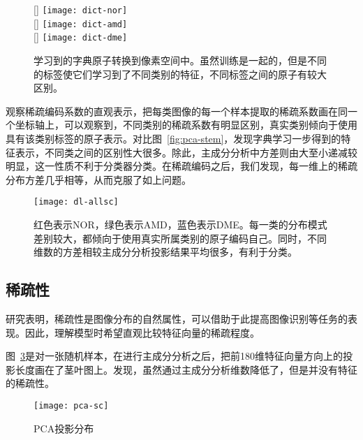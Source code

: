     \begin{figure}[H]
      \centering%
      [\textwidth] %
        {\texttt{[image: dict-nor]}} \\
        \vspace{1em}
      [\textwidth] %
        {\texttt{[image: dict-amd]}} \\
        \vspace{1em}
      [\textwidth] %
        {\texttt{[image: dict-dme]}} \\
      \caption[字典原子可视化]{学习到的字典原子转换到像素空间中。虽然训练是一起的，但是不同的标签使它们学习到了不同类别的特征，不同标签之间的原子有较大区别。}
      \label{fig:dl-dict}
    \end{figure}

    观察稀疏编码系数的直观表示，把每类图像的每一个样本提取的稀疏系数画在同一个坐标轴上，可以观察到，不同类别的稀疏系数有明显区别，真实类别倾向于使用具有该类别标签的原子表示。对比图~\ref{fig:pca-stem}，发现字典学习一步得到的特征表示，不同类之间的区别性大很多。除此，主成分分析中方差则由大至小递减较明显，这一性质不利于分类器分类。在稀疏编码之后，我们发现，每一维上的稀疏分布方差几乎相等，从而克服了如上问题。

    \begin{figure}[H]
      \centering%
      \texttt{[image: dl-allsc]}
      \caption[稀疏表示分布]{红色表示NOR，绿色表示AMD，蓝色表示DME。每一类的分布模式差别较大，都倾向于使用真实所属类别的原子编码自己。同时，不同维数的方差相较主成分分析投影结果平均很多，有利于分类。}
      \label{fig:dl-allsc}
    \end{figure}

    \subsection{稀疏性}
    研究表明，稀疏性是图像分布的自然属性，可以借助于此提高图像识别等任务的表现。因此，理解模型时希望直观比较特征向量的稀疏程度。

    图~\ref{fig:sc-pca}是对一张随机样本，在进行主成分分析之后，把前180维特征向量方向上的投影长度画在了茎叶图上。发现，虽然通过主成分分析维数降低了，但是并没有特征的稀疏性。
    \begin{figure}[H]
      \centering%
      \texttt{[image: pca-sc]}
      \caption{PCA投影分布}
      \label{fig:sc-pca}
    \end{figure}
    
